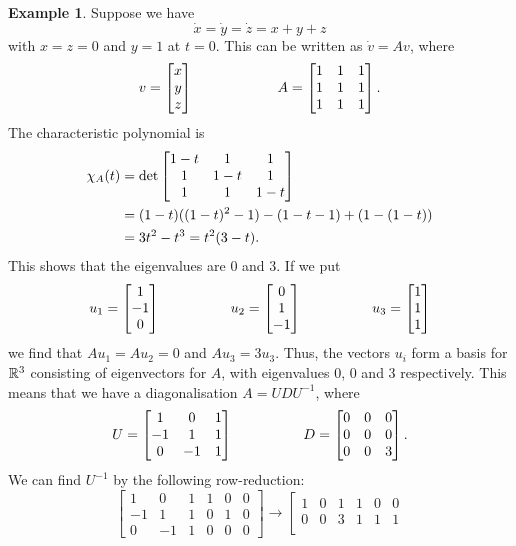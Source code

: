 \documentclass[reqno]{amsart}
\theoremstyle{definition}
\newtheorem{example}[theorem]{Example}
\begin{document}
\begin{example}\label{eg-ode-ii}
 Suppose we have
 \[ \dot{x} = \dot{y} = \dot{z} = x+y+z \]
 with $x=z=0$ and $y=1$ at $t=0$.  This can be written as
 $\dot{v}=Av$, where 
 \[ v = \left[\begin{matrix} x \\ y \\ z \end{matrix}\right] \hspace{6em}
    A = \left[\begin{matrix} 1 & 1 & 1 \\ 1 & 1 & 1 \\ 1 & 1 & 1 \end{matrix}\right].
 \]
 The characteristic polynomial is 
 \begin{align*}
  \chi_A(t) &=
   \det\left[\begin{matrix} 1-t & 1 & 1 \\ 1 & 1-t & 1 \\ 1 & 1 & 1-t \end{matrix}\right] \\
  &= (1-t)((1-t)^2-1) - (1-t-1) + (1-(1-t)) \\
  &= 3t^2 - t^3 = t^2(3-t).
 \end{align*}
 This shows that the eigenvalues are $0$ and $3$.  If we put 
 \[ u_1 = \left[\begin{matrix} 1 \\ -1 \\ 0 \end{matrix}\right] \hspace{5em}
    u_2 = \left[\begin{matrix} 0 \\ 1 \\ -1 \end{matrix}\right] \hspace{5em}
    u_3 = \left[\begin{matrix} 1 \\ 1 \\ 1 \end{matrix}\right]
 \]
 we find that $Au_1=Au_2=0$ and $Au_3=3u_3$.  Thus, the vectors $u_i$
 form a basis for ${\mathbb{R}}^3$ consisting of eigenvectors for $A$, with
 eigenvalues $0$, $0$ and $3$ respectively.  This means that we have a
 diagonalisation $A=UDU^{-1}$, where  
 \[ U = \left[\begin{matrix} 1 & 0 & 1 \\ -1 & 1 & 1 \\ 0 & -1 & 1 \end{matrix}\right]
    \hspace{5em}
    D = \left[\begin{matrix} 0 & 0 & 0 \\ 0 & 0 & 0 \\ 0 & 0 & 3 \end{matrix}\right].
 \] 
 We can find $U^{-1}$ by the following row-reduction:
 \[ 
  \left[\begin{array}{ccc|ccc}
    1 &  0 &  1 &  1 &  0 &  0 \\
   -1 &  1 &  1 &  0 &  1 &  0 \\
    0 & -1 &  1 &  0 &  0 &  0 
  \end{array}\right] \to 
  \left[\begin{array}{ccc|ccc}
    1 &  0 &  1 &  1 &  0 &  0 \\
    0 &  0 &  3 &  1 &  1 &  1 \\

\end{array}\]
\end{example}
\end{document}
